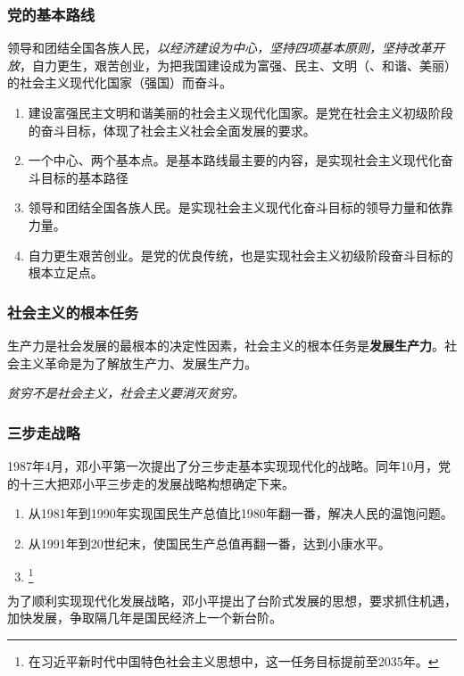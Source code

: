         \subsubsection{党的基本路线}
        领导和团结全国各族人民，\emph{以经济建设为中心，坚持四项基本原则，坚持改革开放}，自力更生，艰苦创业，为把我国建设成为富强、民主、文明（、和谐、美丽）的社会主义现代化国家（强国）而奋斗。
        \begin{enumerate}
            \item 建设富强民主文明和谐美丽的社会主义现代化国家。是党在社会主义初级阶段的奋斗目标，体现了社会主义社会全面发展的要求。
            \item 一个中心、两个基本点。是基本路线最主要的内容，是实现社会主义现代化奋斗目标的基本路径
            \item 领导和团结全国各族人民。是实现社会主义现代化奋斗目标的领导力量和依靠力量。
            \item 自力更生艰苦创业。是党的优良传统，也是实现社会主义初级阶段奋斗目标的根本立足点。
        \end{enumerate}

        \subsubsection{社会主义的根本任务}
        生产力是社会发展的最根本的决定性因素，社会主义的根本任务是\textbf{发展生产力}。社会主义革命是为了解放生产力、发展生产力。

        \emph{贫穷不是社会主义，社会主义要消灭贫穷。}

        \subsubsection{三步走战略}
        1987年4月，邓小平第一次提出了分三步走基本实现现代化的战略。同年10月，党的十三大把邓小平三步走的发展战略构想确定下来。
        \begin{enumerate}
            \item 从1981年到1990年实现国民生产总值比1980年翻一番，解决人民的温饱问题。
            \item 从1991年到20世纪末，使国民生产总值再翻一番，达到小康水平。
            \item {}\footnote{在习近平新时代中国特色社会主义思想中，这一任务目标提前至2035年。}
        \end{enumerate}

        为了顺利实现现代化发展战略，邓小平提出了台阶式发展的思想，要求抓住机遇，加快发展，争取隔几年是国民经济上一个新台阶。

